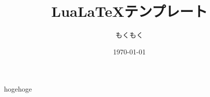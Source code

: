 \documentclass[10pt,a4paper]{ltjsarticle}       %
\title{Lua\LaTeX テンプレート}
\author{もくもく}
\date{\today}
\begin{document}
\maketitle
\thispagestyle{fancy}

hogehoge



\end{document}
